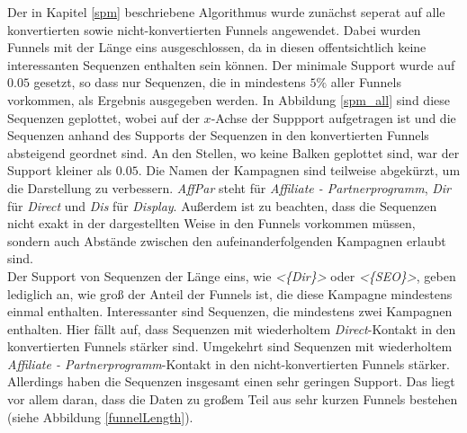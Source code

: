 Der in Kapitel \ref{spm} beschriebene Algorithmus wurde zunächst seperat auf alle konvertierten sowie nicht-konvertierten Funnels angewendet. Dabei wurden Funnels mit der Länge eins ausgeschlossen, da in diesen offentsichtlich keine interessanten Sequenzen enthalten sein können. Der minimale Support wurde auf $0.05$ gesetzt, so dass nur Sequenzen, die in mindestens $5 \%$ aller Funnels vorkommen, als Ergebnis ausgegeben werden. In Abbildung \ref{spm_all} sind diese Sequenzen geplottet, wobei auf der $x$-Achse der Suppport aufgetragen ist und die Sequenzen anhand des Supports der Sequenzen in den konvertierten Funnels absteigend geordnet sind. An den Stellen, wo keine Balken geplottet sind, war der Support kleiner als $0.05$. Die Namen der Kampagnen sind teilweise abgekürzt, um die Darstellung zu verbessern. \textit{AffPar} steht für \textit{Affiliate - Partnerprogramm}, \textit{Dir} für \textit{Direct} und \textit{Dis} für \textit{Display}. Außerdem ist zu beachten, dass die Sequenzen nicht exakt in der dargestellten Weise in den Funnels vorkommen müssen, sondern auch Abstände zwischen den aufeinanderfolgenden Kampagnen erlaubt sind.\\
Der Support von Sequenzen der Länge eins, wie \textit{<\{Dir\}>} oder \textit{<\{SEO\}>}, geben lediglich an, wie groß der Anteil der Funnels ist, die diese Kampagne mindestens einmal enthalten. Interessanter sind Sequenzen, die mindestens zwei Kampagnen enthalten. Hier fällt auf, dass Sequenzen mit wiederholtem \textit{Direct}-Kontakt in den konvertierten Funnels stärker sind. Umgekehrt sind  Sequenzen mit wiederholtem \textit{Affiliate - Partnerprogramm}-Kontakt in den nicht-konvertierten Funnels stärker. Allerdings haben die Sequenzen insgesamt einen sehr geringen Support. Das liegt vor allem daran, dass die Daten zu großem Teil aus sehr kurzen Funnels bestehen (siehe Abbildung \ref{funnelLength}).\\
